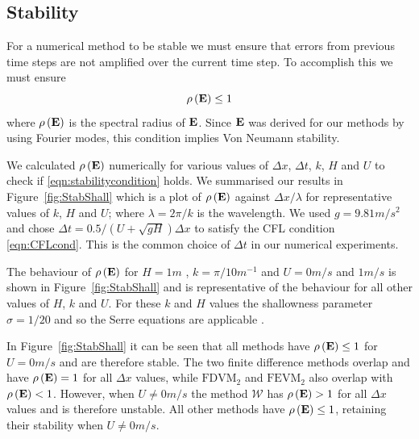 \subsection{Stability}
For a numerical method to be stable we must ensure that errors from previous time steps are not amplified over the current time step. To accomplish this we must ensure 
\begin{equation}
\rho\left(\mathbf{E} \right) \le 1
\label{eqn:stabilitycondition}
\end{equation}
where $\rho\left(\mathbf{E} \right)$ is the spectral radius of $\mathbf{E}$. Since $\mathbf{E}$ was derived for our methods by using Fourier modes, this condition implies Von Neumann stability. 

We calculated $\rho\left(\mathbf{E} \right)$ numerically for various values of $\Delta x$, $\Delta t$, $k$, $H$ and $U$ to check if \eqref{eqn:stabilitycondition} holds. We summarised our results in Figure~\ref{fig:StabShall} which is a plot of $\rho\left(\mathbf{E}\right)$ against $\Delta x / \lambda$ for representative values of $k$, $H$ and $U$; where $\lambda = 2 \pi / k$ is the wavelength. We used $g=9.81m/s^2$ and chose $\Delta t = 0.5 / \left(U + \sqrt{gH}\right) \Delta x$ to satisfy the CFL condition \eqref{eqn:CFLcond}. This is the common choice of $\Delta t$ in our numerical experiments.

The behaviour of $\rho\left(\mathbf{E}\right)$ for $H=1 m$ , $k = {\pi}/{10} m^{-1}$ and $U = 0 m/s$ and $1 m/s$ is shown in Figure~\ref{fig:StabShall} and is representative of the behaviour for all other values of $H$, $k$ and $U$. For these $k$ and $H$ values the shallowness parameter $\sigma = {1}/{20}$ and so the Serre equations are applicable \cite{Barthelemy-2004-315}. 

In Figure~\ref{fig:StabShall} it can be seen that all methods have $\rho\left(\mathbf{E} \right) \le 1$ for $U=0m/s$ and are therefore stable. The two finite difference methods overlap and have $\rho\left(\mathbf{E} \right) = 1$ for all $\Delta x$ values, while $\text{FDVM}_2$ and $\text{FEVM}_2$ also overlap with $\rho\left(\mathbf{E} \right) < 1$. However, when $U \neq 0m/s$ the method $\mathcal{W}$ has $\rho\left(\mathbf{E} \right) > 1$ for all $\Delta x$ values and is therefore unstable. All other methods have $\rho\left(\mathbf{E} \right) \le 1$, retaining their stability when $U \neq 0m/s$.

